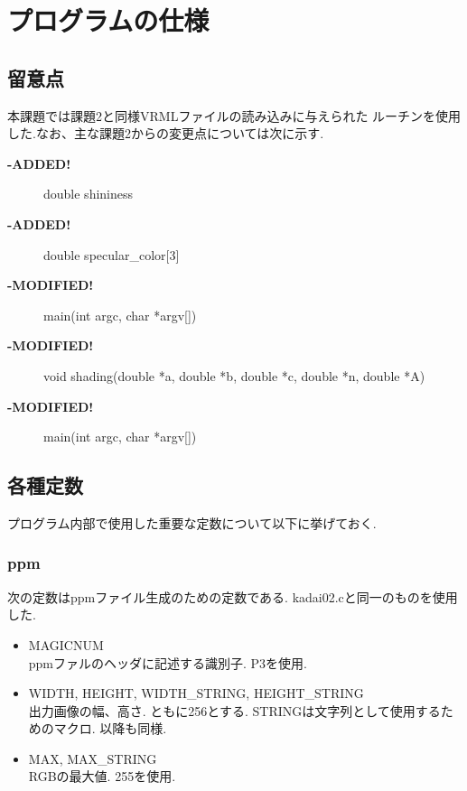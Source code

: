 \documentclass[a4j,dvipdfmx]{jsarticle}
\begin{document}
\section{プログラムの仕様}
\subsection{留意点}
本課題では課題2と同様VRMLファイルの読み込みに与えられた
ルーチンを使用した.なお、主な課題2からの変更点については次に示す.
\begin{description}
\item[{\bf -ADDED!}]double shininess
\item[{\bf -ADDED!}]double specular\_color[3]
\item[{\bf -MODIFIED!}]main(int argc, char *argv[])
\item[{\bf -MODIFIED!}]void shading(double *a, double *b, double *c, double *n, double *A)
\item[{\bf -MODIFIED!}]main(int argc, char *argv[])
\end{description}

                

\subsection{各種定数}
プログラム内部で使用した重要な定数について以下に挙げておく.
\subsubsection{ppm}
次の定数はppmファイル生成のための定数である.
kadai02.cと同一のものを使用した.
\begin{itemize}
\item MAGICNUM\\
  ppmファルのヘッダに記述する識別子. P3を使用.
  
\item WIDTH, HEIGHT, WIDTH\_STRING, HEIGHT\_STRING\\
  出力画像の幅、高さ. ともに256とする. STRINGは文字列として使用するためのマクロ.
  以降も同様.
  
\item MAX, MAX\_STRING\\
  RGBの最大値. 255を使用.

\end{itemize}
\end{document}
